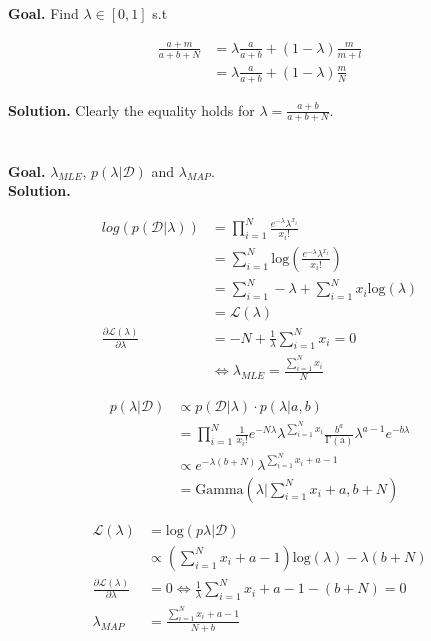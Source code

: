 \documentclass[11pt]{article}
\newcommand{\exercise}{\section{}}
\newcommand{\sumf}[3]{\sum_{#1}^{#2} #3}
\newcommand{\prodf}[3]{\prod_{#1}^{#2} #3}
\begin{document}
\noindent \textbf{Goal.}
Find $\lambda \in [0,1]$ s.t

\begin{align*}
\frac{a + m}{a + b + N} &= \lambda \frac{a}{a + b} + (1 - \lambda) \frac{m}{m + l} \\
&= \lambda \frac{a}{a + b} + (1 - \lambda) \frac{m}{N}
\end{align*}

\noindent \textbf{Solution.} Clearly the equality holds for $\lambda = \frac{a + b}{a + b + N}$.

\exercise

\textbf{Goal.} $\lambda_{MLE}$, $p(\lambda | \mathcal{D})$ and $\lambda_{MAP}$. \\
\noindent \textbf{Solution.}

\begin{align*}
log(p(\mathcal{D} | \lambda)) &= \prod_{i=1}^{N} \frac{e^{-\lambda} \lambda^{x_i}}{x_i !} \tag{by i.i.d assumption} \\
&= \sumf{i=1}{N}{\mathrm{log}(\frac{e^{-\lambda} \lambda^{x_i}}{x_i !})} \\
&= \sumf{i=1}{N}{-\lambda} + \sumf{i=1}{N}{x_i \mathrm{log}(\lambda)} \tag{remove constants w.r.t $\lambda$} \\
&= \mathcal{L}(\lambda) \\
\frac{\partial \mathcal{L}(\lambda)}{\partial \lambda} &= -N + \frac{1}{\lambda} \sumf{i=1}{N}{x_i} = 0 \\
&\Leftrightarrow \lambda_{MLE} = \frac{\sumf{i=1}{N}{x_i}}{N}
\end{align*}

\begin{align*}
p( \lambda | \mathcal{D}) &\varpropto p( \mathcal{D} | \lambda ) \cdot p( \lambda | a, b ) \\
&= \prodf{i=1}{N}{\frac{1}{x_i!}} e^{-N \lambda} \lambda^{\sumf{i=1}{N}{x_i}} \frac{b^a}{\mathrm{\Gamma(a)}} \lambda^{a-1} e^{-b \lambda} \tag{remove constant w.r.t $\lambda$} \\
&\varpropto  e^{-\lambda(b + N)} \lambda^{\sumf{i=1}{N}{x_i} + a - 1} \\
&= \text{Gamma}(\lambda | \sumf{i=1}{N}{x_i} + a, b + N)
\end{align*}

\begin{align*}
\mathcal{L(\lambda)} &= \text{log}(p \lambda | \mathcal{D} ) \\ 
&\varpropto  (\sumf{i=1}{N}{x_i} + a - 1) \text{log}(\lambda) - \lambda(b + N) \\
\frac{\partial \mathcal{L}(\lambda)}{\partial \lambda} &= 0 \Leftrightarrow \frac{1}{\lambda} \sumf{i=1}{N}{x_i} + a - 1 - (b + N) = 0 \\
\lambda_{MAP} &= \frac{\sumf{i=1}{N}{x_i} + a - 1}{N + b}
\end{align*}
\end{document}
